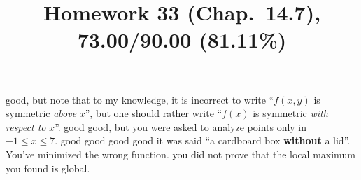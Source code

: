 \documentclass[pstricks,10pt,dvipsnames]{article} %
\title{Homework 33 (Chap.~14.7),
73.00/90.00 (81.11\%)
}
\begin{document}
\maketitle
{}
good, but note that to my knowledge, it is incorrect to write ``$f(x,y)$ is symmetric \textit{above} $x$'',
but one should rather write ``$f(x)$ is symmetric \textit{with respect to} $x$''.
good
good, but you were asked to analyze points only in $-1\le x\le7$.
good
good
good
good
it was said ``a cardboard box \textbf{without} a lid''. You've minimized the wrong function.
you did not prove that the local maximum you found is global.
\end{document}
